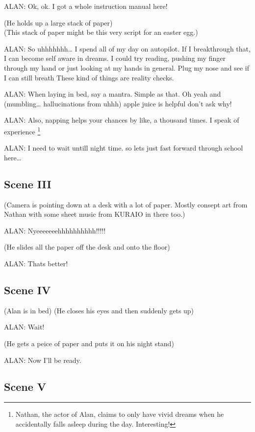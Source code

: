 \documentclass{article}
\begin{document}
\noindent
ALAN: Ok, ok. I got a whole instruction manual here!

\noindent
(He holds up a large stack of paper)\\
(This stack of paper might be this very script for an easter egg.)

\noindent 
ALAN: So uhhhhhhh\ldots{} I spend all of my day on autopilot. If I breakthrough that, I can become self aware in dreams.
I could try reading, pushing my finger through my hand or just looking at my hands in general. Plug my nose and see if I can still breath
These kind of things are reality checks.

\noindent
ALAN: When laying in bed, say a mantra. Simple as that. Oh yeah and (mumbling\ldots{} hallucinations from uhhh) apple juice is helpful don't ask why!

\noindent
ALAN: Also, napping helps your chances by like, a thousand times. I speak of experience \footnote{Nathan, the actor of Alan, claims to only
have vivid dreams when he accidentally falls asleep during the day. Interesting!}

\noindent
ALAN: I need to wait untill night time. so lets just fast forward through school here\ldots{}

\subsection[003 - III]{Scene III}

(Camera is pointing down at a desk with a lot of paper. Mostly consept art from Nathan with some sheet music from KURAIO in there too.)

\noindent
ALAN: Nyeeeeeeehhhhhhhhhh!!!!!

\noindent
(He slides all the paper off the desk and onto the floor)

\noindent
ALAN: Thats better! 

\subsection[004 - IV]{Scene IV}

(Alan is in bed) (He closes his eyes and then suddenly gets up)

\noindent
ALAN: Wait!

\noindent
(He gets a peice of paper and puts it on his night stand)

\noindent
ALAN: Now I'll be ready.

\subsection[005 - V]{Scene V}
\end{document}
